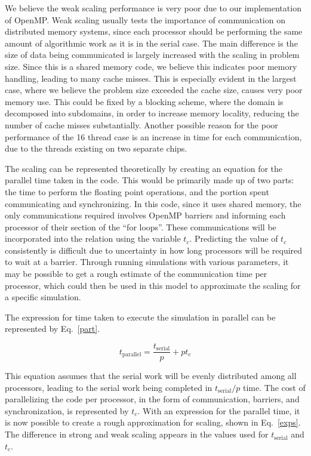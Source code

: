 \documentclass[12pt]{article}
\begin{document}
We believe the weak scaling performance is very poor due to our implementation of OpenMP. Weak scaling usually tests the importance of communication on distributed memory systems, since each processor should be performing the same amount of algorithmic work as it is in the serial case. The main difference is the size of data being communicated is largely increased with the scaling in problem size. Since this is a shared memory code, we believe this indicates poor memory handling, leading to many cache misses. This is especially evident in the largest case, where we believe the problem size exceeded the cache size, causes very poor memory use. This could be fixed by a blocking scheme, where the domain is decomposed into subdomains, in order to increase memory locality, reducing the number of cache misses substantially. Another possible reason for the poor performance of the 16 thread case is an increase in time for each communication, due to the threads existing on two separate chips.

The scaling can be represented theoretically by creating an equation for the parallel time taken in the code. This would be primarily made up of two parts: the time to perform the floating point operations, and the portion spent communicating and synchronizing. In this code, since it uses shared memory, the only communications required involves OpenMP barriers and informing each processor of their section of the ``for loops''. These communications will be incorporated into the relation using the variable $t_c$. Predicting the value of $t_c$ consistently is difficult due to uncertainty in how long processors will be required to wait at a barrier. Through running simulations with various parameters, it may be possible to get a rough estimate of the communication time per processor, which could then be used in this model to approximate the scaling for a specific simulation. 

The expression for time taken to execute the simulation in parallel can be represented by Eq.~\ref{part}.

\begin{equation}
t_{\mathrm{parallel}} = \frac{t_{\mathrm{serial}}}{p} + p t_c
\label{part}
\end{equation}

This equation assumes that the serial work will be evenly distributed among all processors, leading to the serial work being completed in $t_{\mathrm{serial}}/p$ time. The cost of parallelizing the code per processor, in the form of communication, barriers, and synchronization, is represented by $t_c$. With an expression for the parallel time, it is now possible to create a rough approximation for scaling, shown in Eq.~\ref{exps}. The difference in strong and weak scaling appears in the values used for $t_{\mathrm{serial}}$ and $t_c$.
\end{document}
